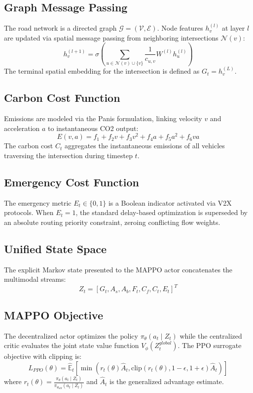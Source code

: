 \documentclass[journal]{IEEEtran}
\begin{document}
\subsection{Graph Message Passing}
The road network is a directed graph $\mathcal{G} = (\mathcal{V}, \mathcal{E})$. Node features $h_v^{(l)}$ at layer $l$ are updated via spatial message passing from neighboring intersections $\mathcal{N}(v)$:
\begin{equation}
h_v^{(l+1)} = \sigma \left( \sum_{u \in \mathcal{N}(v) \cup \{v\}} \frac{1}{c_{u,v}} W^{(l)} h_u^{(l)} \right)
\end{equation}
The terminal spatial embedding for the intersection is defined as $G_t = h_v^{(L)}$.

\subsection{Carbon Cost Function}
Emissions are modeled via the Panis formulation, linking velocity $v$ and acceleration $a$ to instantaneous CO2 output:
\begin{equation}
E(v, a) = f_1 + f_2 v + f_3 v^2 + f_4 a + f_5 a^2 + f_6 v a
\end{equation}
The carbon cost $C_t$ aggregates the instantaneous emissions of all vehicles traversing the intersection during timestep $t$.

\subsection{Emergency Cost Function}
The emergency metric $E_t \in \{0, 1\}$ is a Boolean indicator activated via V2X protocols. When $E_t = 1$, the standard delay-based optimization is superseded by an absolute routing priority constraint, zeroing conflicting flow weights.

\subsection{Unified State Space}
The explicit Markov state presented to the MAPPO actor concatenates the multimodal streams:
\begin{equation}
Z_t = \left[ G_t, A_s, A_b, F_t, C_f, C_t, E_t \right]^T
\end{equation}

\subsection{MAPPO Objective}
The decentralized actor optimizes the policy $\pi_\theta(a_t \mid Z_t)$ while the centralized critic evaluates the joint state value function $V_\phi(Z_t^{global})$. The PPO surrogate objective with clipping is:
\begin{equation}
L_{PPO}(\theta) = \hat{\mathbb{E}}_t \left[ \min(r_t(\theta) \hat{A}_t, \text{clip}(r_t(\theta), 1-\epsilon, 1+\epsilon) \hat{A}_t) \right]
\end{equation}
where $r_t(\theta) = \frac{\pi_\theta(a_t \mid Z_t)}{\pi_{\theta_{old}}(a_t \mid Z_t)}$ and $\hat{A}_t$ is the generalized advantage estimate.
\end{document}
